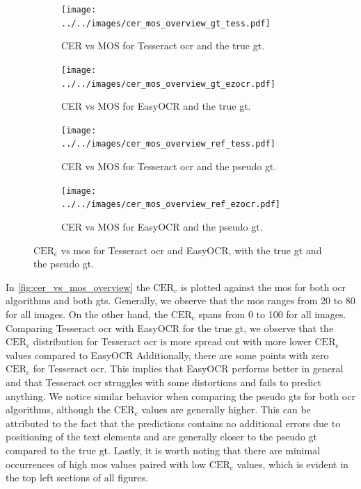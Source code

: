 \begin{figure}
    \begin{subfigure}[b]{0.45\textwidth}
        \centering
        \texttt{[image: ../../images/cer\_mos\_overview\_gt\_tess.pdf]}
        \caption{CER vs MOS for Tesseract \gls{ocr} and the true \gls{gt}.}
        \label{fig:cer_vs_mos_gt_tess}
    \end{subfigure}
    \hfill
    \begin{subfigure}[b]{0.45\textwidth}
        \centering
        \texttt{[image: ../../images/cer\_mos\_overview\_gt\_ezocr.pdf]}
        \caption{CER vs MOS for EasyOCR and the true \gls{gt}.}
        \label{fig:cer_vs_mos_gt_ocr}
    \end{subfigure}
    \newline
    \begin{subfigure}[b]{0.45\textwidth}
        \centering
        \texttt{[image: ../../images/cer\_mos\_overview\_ref\_tess.pdf]}
        \caption{CER vs MOS for Tesseract \gls{ocr} and the pseudo \gls{gt}.}
        \label{fig:cer_vs_mos_ref_tess}
    \end{subfigure}
    \hfill
    \begin{subfigure}[b]{0.45\textwidth}
        \centering
        \texttt{[image: ../../images/cer\_mos\_overview\_ref\_ezocr.pdf]}
        \caption{CER vs MOS for EasyOCR and the pseudo \gls{gt}.}
        \label{fig:cer_vs_mos_ref_ocr}
    \end{subfigure}
    \caption{$\text{CER}_{\text{c}}$ vs \gls{mos} for Tesseract \gls{ocr} and EasyOCR, with the true \gls{gt} and the pseudo \gls{gt}.}
    \label{fig:cer_vs_mos_overview}
\end{figure}

In \autoref{fig:cer_vs_mos_overview} the $\text{CER}_{\text{c}}$ is plotted against the \gls{mos} for both \gls{ocr} algorithms and both \glspl{gt}.
Generally, we observe that the \gls{mos} ranges from 20 to 80 for all images.
On the other hand, the $\text{CER}_{\text{c}}$ spans from 0 to 100 for all images.
Comparing Tesseract \gls{ocr} with EasyOCR for the true \gls{gt}, we observe that the $\text{CER}_{\text{c}}$ distribution for Tesseract \gls{ocr} is more spread out with more lower $\text{CER}_{\text{c}}$ values compared to EasyOCR
Additionally, there are some points with zero $\text{CER}_{\text{c}}$ for Tesseract \gls{ocr}.
This implies that EasyOCR performs better in general and that Tesseract \gls{ocr} struggles with some distortions and fails to predict anything.
We notice similar behavior when comparing the pseudo \glspl{gt} for both \gls{ocr} algorithms, although the $\text{CER}_{\text{c}}$ values are generally higher.
This can be attributed to the fact that the predictions contains no additional errors due to positioning of the text elements and are generally closer to the pseudo \gls{gt} compared to the true \gls{gt}.
Lastly, it is worth noting that there are minimal occurrences of high \gls{mos} values paired with low $\text{CER}_{\text{c}}$ values, which is evident in the top left sections of all figures.


